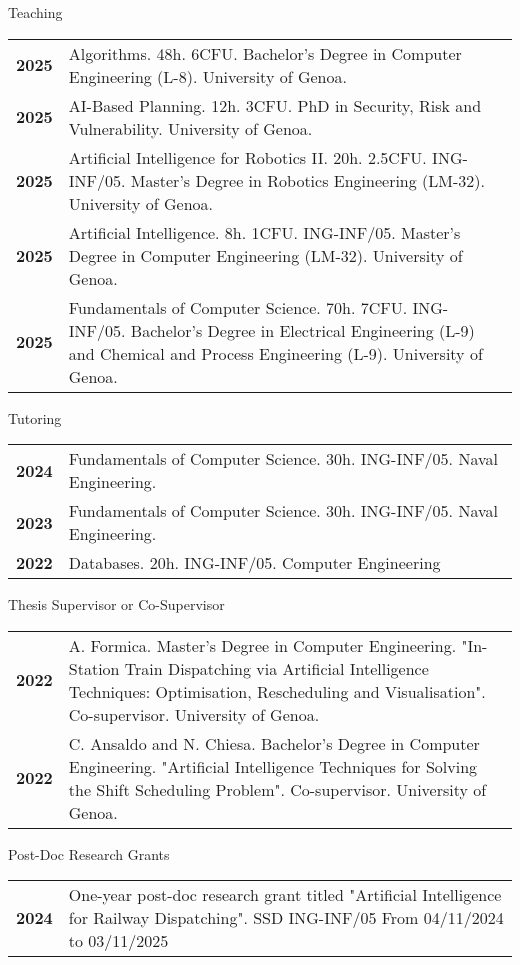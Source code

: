 \documentclass{resume} %
\begin{document}
\begin{rSection}{Teaching}
	\begin{tabularx}{0.95\textwidth} {lp{14cm}}
 \textbf{2025} & Algorithms. 48h. 6CFU. Bachelor's Degree in Computer Engineering (L-8). University of Genoa.  \\
 \textbf{2025} & AI-Based Planning. 12h. 3CFU. PhD in Security, Risk and Vulnerability. University of Genoa.  \\
 \textbf{2025} & Artificial Intelligence for Robotics II. 20h. 2.5CFU. ING-INF/05. Master’s Degree in Robotics Engineering (LM-32). University of Genoa.  \\
  \textbf{2025} & Artificial Intelligence. 8h. 1CFU. ING-INF/05. Master’s Degree in Computer Engineering (LM-32). University of Genoa.  \\
  \textbf{2025} & Fundamentals of Computer Science. 70h. 7CFU. ING-INF/05. Bachelor’s Degree in Electrical Engineering (L-9) and Chemical and Process Engineering (L-9). University of Genoa.  \\
\end{tabularx}
\pagebreak
\end{rSection}
\begin{rSection}{Tutoring}
	\begin{tabularx}{0.95\textwidth} {lp{14cm}}
 \textbf{2024} & Fundamentals of Computer Science. 30h. ING-INF/05. Naval Engineering.  \\
 \textbf{2023} & Fundamentals of Computer Science. 30h. ING-INF/05. Naval Engineering.  \\
 \textbf{2022} & Databases. 20h. ING-INF/05. Computer Engineering \end{tabularx}
\end{rSection}
\begin{rSection}{Thesis Supervisor or Co-Supervisor}
	\begin{tabularx}{0.95\textwidth} {lp{14cm}}
 \textbf{2022} & A. Formica. Master’s Degree in Computer Engineering. "In-Station Train Dispatching via Artificial Intelligence Techniques: Optimisation, Rescheduling and Visualisation". Co-supervisor. University of Genoa.  \\
 \textbf{2022} & C. Ansaldo and N. Chiesa. Bachelor’s Degree in Computer Engineering. "Artificial Intelligence Techniques for Solving the Shift Scheduling Problem". Co-supervisor. University of Genoa.
 \end{tabularx}
\end{rSection}

\begin{rSection}{Post-Doc Research Grants}
	\begin{tabularx}{0.95\textwidth} {lp{14cm}}
 \textbf{2024} & One-year post-doc research grant titled "Artificial Intelligence for Railway Dispatching". SSD ING-INF/05 From 04/11/2024 to 03/11/2025
 \end{tabularx}
\end{rSection}
\end{document}
